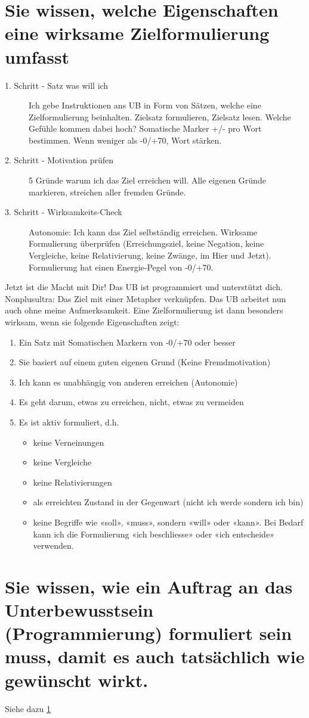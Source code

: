 \section{Sie wissen, welche Eigenschaften eine wirksame Zielformulierung umfasst}
\label{sec:how-to-be-successful-with-ub}

\begin{description}
	\item[1. Schritt - Satz was will ich] Ich gebe Instruktionen ans UB in Form von Sätzen, welche eine Zielformulierung beinhalten. Zielsatz formulieren, Zielsatz lesen. Welche Gefühle kommen dabei hoch? Somatische Marker +/- pro Wort bestimmen. Wenn weniger als -0/+70, Wort stärken.
	\item[2. Schritt - Motivation prüfen] 5 Gründe warum ich das Ziel erreichen will. Alle eigenen Gründe markieren, streichen aller fremden Gründe.
	\item[3. Schritt - Wirksamkeits-Check] Autonomie: Ich kann das Ziel selbständig erreichen. Wirksame Formulierung überprüfen (Erreichungsziel, keine Negation, keine Vergleiche, keine Relativierung, keine Zwänge, im Hier und Jetzt). Formulierung hat einen Energie-Pegel von -0/+70. 
\end{description}
Jetzt ist die Macht mit Dir! Das UB ist programmiert und unterstützt dich.
Nonplusultra: Das Ziel mit einer Metapher verknüpfen. Das UB arbeitet nun auch ohne meine Aufmerksamkeit. Eine Zielformulierung ist dann besonders wirksam, wenn sie folgende Eigenschaften zeigt:

\begin{enumerate}
	\item Ein Satz mit Somatischen Markern von -0/+70 oder besser
	\item Sie basiert auf einem guten eigenen Grund (Keine Fremdmotivation)
	\item Ich kann es unabhängig von anderen erreichen (Autonomie)
	\item Es geht darum, etwas zu erreichen, nicht, etwas zu vermeiden
	\item Es ist aktiv formuliert, d.h. 
	\begin{itemize}
		\item keine Verneinungen
		\item keine Vergleiche
		\item keine Relativierungen
		\item als erreichten Zustand in der Gegenwart (nicht ich werde sondern ich bin)
		\item keine Begriffe wie «soll», «muss», sondern «will» oder «kann». Bei Bedarf kann ich die Formulierung «ich beschliesse» oder «ich entscheide» verwenden.
	\end{itemize}
\end{enumerate}


\section{Sie wissen, wie ein Auftrag an das Unterbewusstsein (Programmierung) formuliert sein muss, damit es auch tatsächlich wie gewünscht wirkt.}

Siehe dazu \ref{sec:how-to-be-successful-with-ub}
